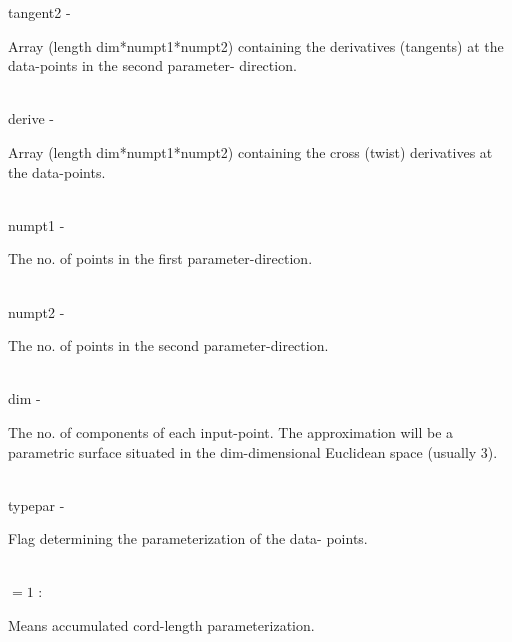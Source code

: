         \>\>    {\fov tangent2}\> - \>  \begin{minipg2}
                                Array (length dim*numpt1*numpt2) containing the
                                derivatives (tangents) at the data-points in the second parameter-
                                direction.
                                \end{minipg2}\\[0.3ex]
        \>\>    {\fov derive}\> - \>    \begin{minipg2}
                                Array (length dim*numpt1*numpt2) containing the cross
                                (twist) derivatives at the data-points.
                                \end{minipg2} \\[0.3ex]
        \>\>    {\fov numpt1}\> - \> \begin{minipg2}
                                The no. of points in the first parameter-direction.
                                \end{minipg2}\\
        \>\>    {\fov numpt2}   \> - \> \begin{minipg2}
                                The no. of points in the second parameter-direction.
                                \end{minipg2}\\
        \>\>    {\fov dim}      \> - \> \begin{minipg2}
                                The no. of components of each input-point. The
                                approximation will be a parametric surface situated in
                                the {\fov dim}-dimensional Euclidean
                                space (usually 3).
                                \end{minipg2}\\[0.3ex]
        \>\>    {\fov typepar}\> - \> \begin{minipg2}
                                Flag determining the parameterization of the data-
                                points.
                                \end{minipg2} \\[0.3ex]
                \>\>\>\>\>      $= 1$ :\>       \begin{minipg5}
                                                Means accumulated cord-length
                                                  para\-meterization.
                                        \end{minipg5}\\[0.8ex]
